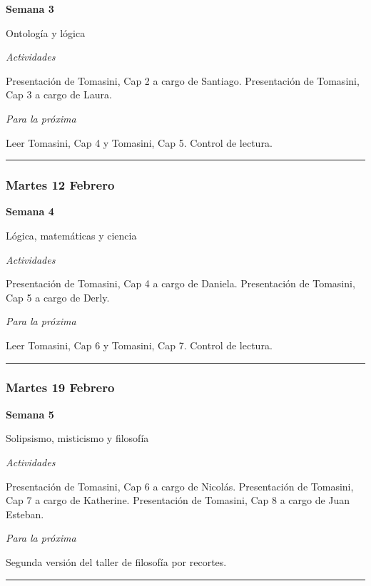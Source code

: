 \documentclass[spanish,]{article}
\begin{document}
\textbf{Semana 3}

Ontología y lógica

\emph{Actividades}

Presentación de Tomasini, Cap 2 a cargo de Santiago. Presentación de
Tomasini, Cap 3 a cargo de Laura.

\emph{Para la próxima}

Leer Tomasini, Cap 4 y Tomasini, Cap 5. Control de lectura.

\begin{center}\rule{0.5\linewidth}{\linethickness}\end{center}

\subsubsection{Martes 12 Febrero}\label{martes-12-febrero}

\textbf{Semana 4}

Lógica, matemáticas y ciencia

\emph{Actividades}

Presentación de Tomasini, Cap 4 a cargo de Daniela. Presentación de
Tomasini, Cap 5 a cargo de Derly.

\emph{Para la próxima}

Leer Tomasini, Cap 6 y Tomasini, Cap 7. Control de lectura.

\begin{center}\rule{0.5\linewidth}{\linethickness}\end{center}

\subsubsection{Martes 19 Febrero}\label{martes-19-febrero}

\textbf{Semana 5}

Solipsismo, misticismo y filosofía

\emph{Actividades}

Presentación de Tomasini, Cap 6 a cargo de Nicolás. Presentación de
Tomasini, Cap 7 a cargo de Katherine. Presentación de Tomasini, Cap 8 a
cargo de Juan Esteban.

\emph{Para la próxima}

Segunda versión del taller de filosofía por recortes.

\begin{center}\rule{0.5\linewidth}{\linethickness}\end{center}
\end{document}
